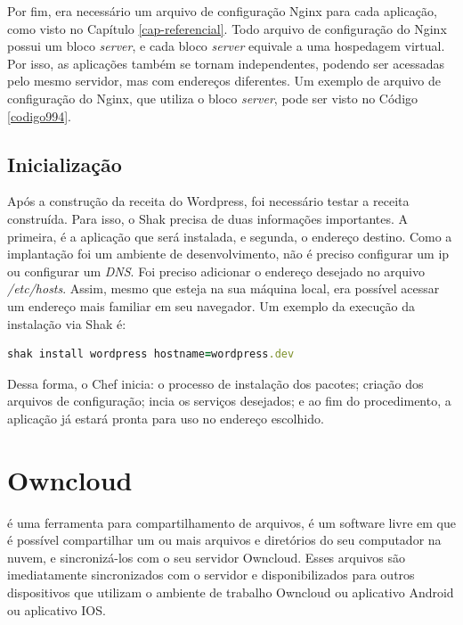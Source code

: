Por fim, era necessário um arquivo de configuração Nginx para cada aplicação,
como visto no Capítulo \ref{cap-referencial}. Todo arquivo de configuração
do Nginx possui um bloco \textit{server}, e cada bloco \textit{server} equivale a uma hospedagem virtual. 
Por isso, as aplicações também se tornam independentes, podendo ser acessadas pelo 
mesmo servidor, mas com endereços diferentes. Um exemplo de arquivo de configuração
do Nginx, que utiliza o bloco \textit{server}, pode ser visto no Código \ref{codigo994}.

\subsection{Inicialização}

Após a construção da receita do Wordpress, foi necessário testar a receita construída. 
Para isso, o Shak precisa de duas informações importantes. A primeira, é a aplicação
que será instalada, e segunda, o endereço destino. Como a implantação foi um ambiente de desenvolvimento,
não é preciso configurar um ip ou configurar um \textit{DNS}. Foi preciso adicionar o
endereço desejado no arquivo \textit{/etc/hosts}. Assim, mesmo que esteja na sua máquina local, 
era possível acessar um endereço mais familiar em seu navegador. Um exemplo da execução
da instalação via Shak é:

\begin{lstlisting}[language=Ruby,label=dice_index,caption={Exemplo de execução de instalação do wordpress com shak}]
shak install wordpress hostname=wordpress.dev
\end{lstlisting}

Dessa forma, o Chef inicia: o processo de instalação dos pacotes; criação dos arquivos
de configuração; incia os serviços desejados; e ao fim do procedimento, a aplicação
já estará pronta para uso no endereço escolhido.

\section{Owncloud}
\label{sub:owncloud}

 é uma ferramenta para compartilhamento de arquivos, é um software 
livre em que é possível compartilhar
um ou mais arquivos e diretórios do seu computador na nuvem, e sincronizá-los com o seu
servidor Owncloud. Esses arquivos são imediatamente sincronizados com o servidor
e disponibilizados para outros dispositivos que utilizam o ambiente de trabalho
Owncloud ou aplicativo Android ou aplicativo IOS.

